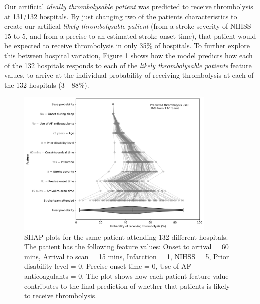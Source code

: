Our artificial \emph{ideally thrombolysable patient} was predicted to receive thrombolysis at 131/132 hospitals. By just changing two of the patients characteristics to create our artifical \emph{likely thrombolysable patient} (from a stroke severity of NIHSS 15 to 5, and from a precise to an estimated stroke onset time), that patient would be expected to receive thrombolysis in only 35\% of hospitals. To further explore this between hospital variation, Figure \ref{fig:results_artifical_shap_waterfall_with_violin} shows how the model predicts how each of the 132 hospitals responds to each of the \emph{likely thrombolysable patients} feature values, to arrive at the individual probability of receiving thrombolysis at each of the 132 hospitals (3 - 88\%).

\begin{figure}[!h]
\centering
\includegraphics[width=0.85\textwidth]{./images/21_shap_waterfall_with_violin_no_benchmark}
\caption{SHAP plots for the same patient attending 132 different hospitals. The patient has the following feature values: Onset to arrival = 60 mins, Arrival to scan = 15 mins, Infarction = 1, NIHSS = 5, Prior disability level = 0, Precise onset time = 0, Use of AF anticoagulants = 0. The plot shows how each patient feature value contributes to the final prediction of whether that patients is likely to receive thrombolysis.}
\label{fig:results_artifical_shap_waterfall_with_violin}
\end{figure}
\fi







